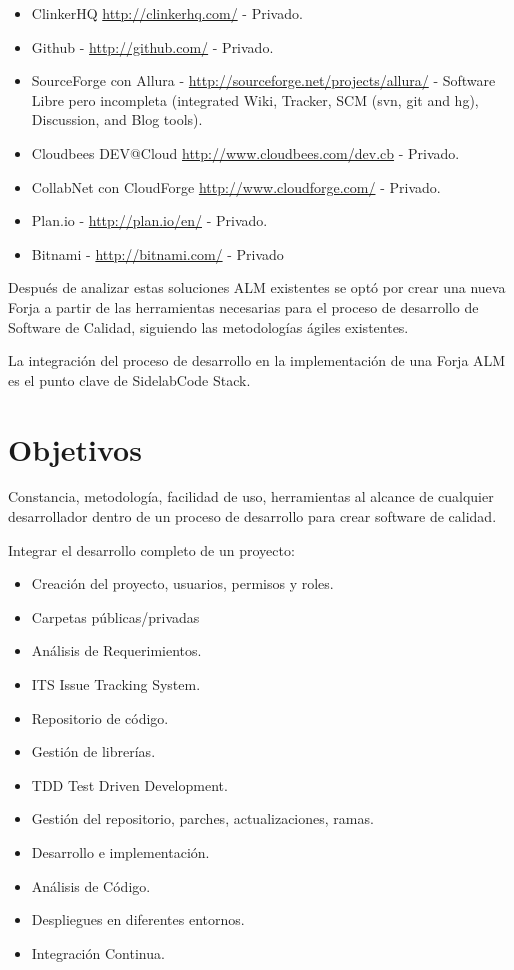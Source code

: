 \documentclass[11pt]{scrartcl}
\begin{document}
\begin{itemize}
	\item ClinkerHQ \url{http://clinkerhq.com/} - Privado.
	\item Github - \url{http://github.com/} - Privado.
	\item SourceForge con Allura - \url{http://sourceforge.net/projects/allura/} - Software Libre pero incompleta (integrated Wiki, Tracker, SCM (svn, git and hg), Discussion, and Blog tools).
	\item Cloudbees DEV@Cloud \url{http://www.cloudbees.com/dev.cb} - Privado.
	\item CollabNet con CloudForge \url{http://www.cloudforge.com/} - Privado.
	\item Plan.io - \url{http://plan.io/en/} - Privado.
	\item Bitnami - \url{http://bitnami.com/} - Privado
\end{itemize}

\par Después de analizar estas soluciones ALM existentes se optó por crear una nueva Forja a partir de las herramientas necesarias para el proceso de desarrollo de Software de Calidad, siguiendo las metodologías ágiles existentes.

\par La integración del proceso de desarrollo en la implementación de una Forja ALM es el punto clave de SidelabCode Stack.


\section{Objetivos}
\label{sec:objetivos}

\par Constancia, metodolog\'ia, facilidad de uso, herramientas al alcance de cualquier desarrollador dentro de un proceso de desarrollo para crear software de calidad.

\par Integrar el desarrollo completo de un proyecto:

\begin{itemize}
	\item Creación del proyecto, usuarios, permisos y roles.
	\item Carpetas públicas/privadas
	\item Análisis de Requerimientos.
	\item ITS Issue Tracking System.
	\item Repositorio de código.
	\item Gestión de librerías.
	\item TDD Test Driven Development.
	\item Gestión del repositorio, parches, actualizaciones, ramas.
	\item Desarrollo e implementación.
	\item Análisis de Código.
	\item Despliegues en diferentes entornos.
	\item Integración Continua.
\end{itemize}
\end{document}
